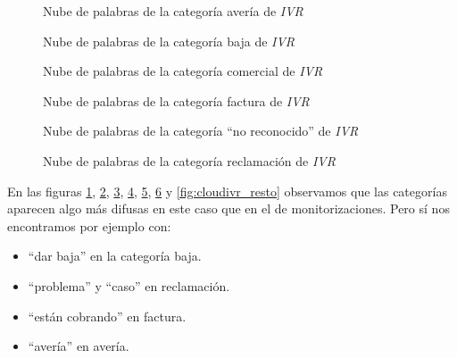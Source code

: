 \begin{figure}[!ht]
	\centering
    \caption{Nube de palabras de la categoría avería de \textit{IVR}}
    \label{fig:cloudivr_ave}
\end{figure} 


\begin{figure}[!ht]
	\centering
    \caption{Nube de palabras de la categoría baja de \textit{IVR}}
    \label{fig:cloudivr_baja}
\end{figure} 

\begin{figure}[!ht]
	\centering
    \caption{Nube de palabras de la categoría comercial de \textit{IVR}}
    \label{fig:cloudivr_comercial}
\end{figure} 

\begin{figure}[!ht]
	\centering
    \caption{Nube de palabras de la categoría factura de \textit{IVR}}
    \label{fig:cloudivr_factura}
\end{figure} 

\begin{figure}[!ht]
	\centering
    \caption{Nube de palabras de la categoría ``no reconocido'' de \textit{IVR}}
    \label{fig:cloudivr_nrec}
\end{figure} 

\begin{figure}[!ht]
	\centering
    \caption{Nube de palabras de la categoría reclamación de \textit{IVR}}
    \label{fig:cloudivr_recl}
\end{figure} 


  
  
  
    
En las figuras  \ref{fig:cloudivr_ave}, \ref{fig:cloudivr_baja}, \ref{fig:cloudivr_comercial}, \ref{fig:cloudivr_factura}, \ref{fig:cloudivr_nrec}, \ref{fig:cloudivr_recl} y \ref{fig:cloudivr_resto}  observamos que las  categorías aparecen algo más difusas en este caso que en el de
monitorizaciones. Pero sí nos encontramos por ejemplo con:
\begin{itemize}
\item  ``dar baja'' en la categoría baja.

\item ``problema'' y ``caso'' en reclamación.

\item ``están cobrando'' en factura.

\item ``avería'' en avería.

\end{itemize}

